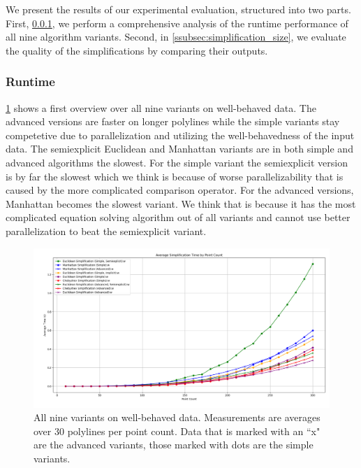 We present the results of our experimental evaluation, structured into two parts. First, \cref{ssubsec:runtime}, we perform a comprehensive analysis  of the runtime performance of all nine algorithm variants. Second, in \cref{ssubsec:simplification_size}, we evaluate the quality of the simplifications by comparing their outputs. 

\subsubsection{Runtime}
\label{ssubsec:runtime}

\cref{fig:res_all300w} shows a first overview over all nine variants on well-behaved data. The advanced versions are faster on longer polylines while the simple variants stay competetive due to parallelization and utilizing the well-behavedness of the input data. The semiexplicit Euclidean and Manhattan variants are in both simple and advanced algorithms the slowest. For the simple variant the semiexplicit version is by far the slowest which we think is because of worse parallelizability that is caused by the more complicated comparison operator. For the advanced versions, Manhattan becomes the slowest variant. We think that is because it has the most complicated equation solving algorithm out of all variants and cannot use better parallelization to beat the semiexplicit variant.

\begin{figure}[b]
  \centering
	\includegraphics[scale=0.4]{figures/res_all300w.png}
  \caption{All nine variants on well-behaved data. Measurements are averages over 30 polylines per point count. Data that is marked with an ``x" are the advanced variants, those marked with dots are the simple variants. }
  \label{fig:res_all300w}
\end{figure}

